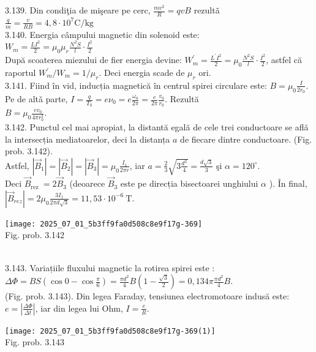 3.139. Din condiţia de mişeare pe cerc, $\frac{m v^{2}}{R}=q v B$ rezultã\\ $\frac{q}{m}=\frac{v}{R B}=4,8 \cdot 10^{7} \mathrm{C} / \mathrm{kg}$\\

3.140. Energia câmpului magnetic din solenoid este:\\ $W_{m}=\frac{L I^{2}}{2}=\mu_{0} \mu_{r} \frac{N^{2} S}{l} \cdot \frac{I^{2}}{2}$\\ După scoaterea miezului de fier energia devine: $W_{m}^{\prime}=\frac{L^{\prime} I^{2}}{2}=\mu_{0} \frac{N^{2} S}{l} \cdot \frac{I^{2}}{2}$, astfel că raportul $W_{m}^{\prime} / W_{m}=1 / \mu_{r}$. Deci energia scade de $\mu_{r}$ ori.\\

3.141. Fiind în vid, inducția magnetică în centrul spirei circulare este: $B=\mu_{0} \frac{I}{2 r_{0}}$. Pe de altǎ parte, $I=\frac{q}{T_{0}}=e \nu_{0}=e \frac{\omega_{0}}{2 \pi}=\frac{e}{2 \pi} \frac{v_{0}}{r_{0}}$. Rezultă\\ $B=\mu_{0} \frac{e v_{0}}{4 \pi r_{0}^{2}}$.\\

3.142. Punctul cel mai apropiat, la distantă egală de cele trei conductoare se află la intersecția mediatoarelor, deci la distanța $a$ de fiecare dintre conductoare. (Fig. prob. 3.142).\\ Astfel, $\left|\vec{B}_{1}\right|=\left|\vec{B}_{2}\right|=\left|\vec{B}_{3}\right|=\mu_{0} \frac{I_{1}}{2 \pi r}$, iar $a=\frac{2}{3} \sqrt{3 \frac{d^{2}}{4}}=\frac{d \sqrt{3}}{3}$ şi $\alpha=120^{\circ}$.\\ Deci $\vec{B}_{\text {rez }}=2 \vec{B}_{3}$ (deoarece $\vec{B}_{3}$ este pe direcția bisectoarei unghiului $\alpha$ ). În final, $\left|\vec{B}_{r e z}\right|=2 \mu_{0} \frac{3 I_{1}}{2 \pi d \sqrt{3}}=11,53 \cdot 10^{-6} \mathrm{~T}$.\\ \begin{center} \texttt{[image: 2025\_07\_01\_5b3ff9fa0d508c8e9f17g-369]}\\ Fig. prob. 3.142 \end{center}\\

3.143. Variațiile fluxului magnetic la rotirea spirei este :\\ $\Delta \Phi=B S\left(\cos 0-\cos \frac{\pi}{6}\right)=\frac{\pi d^{2}}{4} B\left(1-\frac{\sqrt{3}}{2}\right)=0,134 \pi \frac{\pi d^{2}}{4} B$.\\ (Fig. prob. 3.143). Din legea Faraday, tensiunea electromotoare indusă este:\\ $e=\left|\frac{\Delta \Phi}{\Delta t}\right|$, iar din legea lui Ohm, $I=\frac{e}{R}$.\\ \begin{center} \texttt{[image: 2025\_07\_01\_5b3ff9fa0d508c8e9f17g-369(1)]}\\ Fig. prob. 3.143 \end{center}\\

